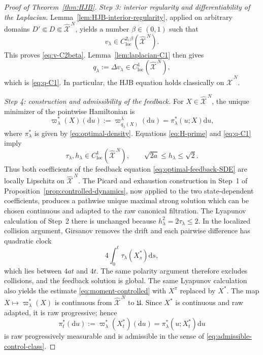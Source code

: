 \documentclass[11pt]{article}
\def\Xc{{\mathcal X}}
\def\hX{\widehat{\Xc}^{\,N}}
\newcommand{\dd}{\mathrm{d}}
\theoremstyle{definition}
\theoremstyle{remark}
\numberwithin{equation}{section}
\begin{document}
\begin{proof}[Proof of Theorem~\ref{thm:HJB}]
\medskip
\noindent\textit{Step 3: interior regularity and differentiability of the Laplacian.}
Lemma~\ref{lem:HJB-interior-regularity}, applied on arbitrary domains
$D'\Subset D\Subset\hX$, yields a number $\beta\in(0,1)$ such that
\[
 v_\lambda\in C_{\mathrm{loc}}^{2,\beta}(\hX).
\]
This proves \eqref{eq:v-C2beta}.  Lemma~\ref{lem:laplacian-C1} then gives
\[
 q_\lambda:=\Delta v_\lambda\in C_{\mathrm{loc}}^1(\hX),
\]
which is \eqref{eq:q-C1}.  In particular, the HJB equation holds classically on $\hX$.

\medskip
\noindent\textit{Step 4: construction and admissibility of the feedback.}
For $X\in\hX$, the unique minimizer of the pointwise Hamiltonian is
\[
 \varpi_\lambda^*(X)(\dd u)
 :=\varpi_{q_\lambda(X)}^\lambda(\dd u)
 =\pi_\lambda^*(u;X)\dd u,
\]
where $\pi_\lambda^*$ is given by \eqref{eq:optimal-density}.  Equations
\eqref{eq:H-prime} and \eqref{eq:q-C1} imply
\[
 \tau_\lambda,h_\lambda\in C^1_{\mathrm{loc}}(\hX),
 \qquad
 \sqrt{2a}\le h_\lambda\le\sqrt2.
\]
Thus both coefficients of the feedback equation \eqref{eq:optimal-feedback-SDE} are locally
Lipschitz on $\hX$.  The Picard and exhaustion construction in Step~1 of
Proposition~\ref{prop:controlled-dynamics}, now applied to the two state-dependent coefficients,
produces a pathwise unique maximal strong solution which can be chosen continuous and adapted to
the raw canonical filtration.  The Lyapunov calculation of Step~2 there is unchanged because
$h_\lambda^2=2\tau_\lambda\le2$.  In the localized collision argument, Girsanov removes the drift
and each pairwise difference has quadratic clock
\[
 4\int_0^t\tau_\lambda(X_s^*)\dd s,
\]
which lies between $4at$ and $4t$.  The same polarity argument therefore excludes collisions, and
the feedback solution is global.  The same Lyapunov calculation also yields the estimate
\eqref{eq:moment-controlled} with $X^\pi$ replaced by $X^*$.
The map $X\mapsto\varpi_\lambda^*(X)$ is continuous from $\hX$ to $\mathfrak U$.  Since $X^*$ is
continuous and raw adapted, it is raw progressive; hence
\begin{equation}\label{eq:feedback-control-raw-progressive}
 \pi_t^*(\dd u)
 :=\varpi_\lambda^*(X_t^*)(\dd u)
 =\pi_\lambda^*(u;X_t^*)\dd u
\end{equation}
is raw progressively measurable and is admissible in the sense of
\eqref{eq:admissible-control-class}.


\end{proof}
\end{document}
